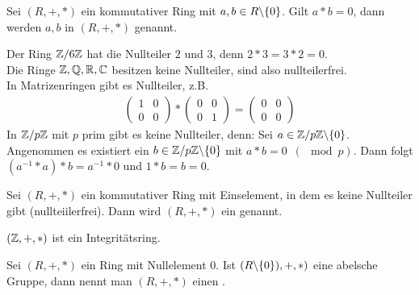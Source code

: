 %
\begin{defin}
	Sei $(R,+,*)$ ein kommutativer Ring mit $a,b \in R \backslash \{ 0 \}$. Gilt $a*b = 0$, dann werden $a,b$  in $(R,+,*)$ genannt.
\end{defin}
%
\begin{bsp}
	Der Ring $\mathbb{Z} / 6 \mathbb{Z}$ hat die Nullteiler $2$ und $3$, denn $2*3=3*2=0$. \\
	Die Ringe $\mathbb{Z}, \mathbb{Q}, \mathbb{R}, \mathbb{C}$ besitzen keine Nullteiler, sind also nullteilerfrei. \\
	In Matrizenringen gibt es Nullteiler, z.B.
	\begin{align*}
		\begin{pmatrix} 1 & 0 \\ 0 & 0 \end{pmatrix} * 
		\begin{pmatrix} 0 & 0 \\ 0 & 1 \end{pmatrix} =
		\begin{pmatrix} 0 & 0 \\ 0 & 0 \end{pmatrix}
	\end{align*}
	In $\mathbb{Z} / p \mathbb{Z}$ mit $p$ prim gibt es keine Nullteiler, denn: Sei $a \in \mathbb{Z} / p \mathbb{Z} \backslash \{ 0 \}$. Angenommen es existiert ein $b \in \mathbb{Z} / p \mathbb{Z} \backslash \{ 0 \}$ mit $a*b=0 \enspace (\mod p)$. Dann folgt $(a^{-1}*a)*b = a^{-1} * 0$ und $1*b=b=0$. \Lightning
\end{bsp}
%
\begin{defin}
	Sei $(R,+,*)$ ein kommutativer Ring mit Einselement, in dem es keine Nullteiler gibt (nullteiilerfrei). Dann wird $(R,+,*)$ ein  genannt.
\end{defin}
%
\begin{bsp}
	$(\mathbb{Z}, +,*)$ ist ein Integritätsring.
\end{bsp}
%
\begin{defin}
	Sei $(R,+,*)$ ein Ring mit Nullelement $0$. Ist $(R \backslash \{ 0 \}), +,*)$ eine abelsche Gruppe, dann nennt man $(R,+,*)$ einen .
\end{defin}